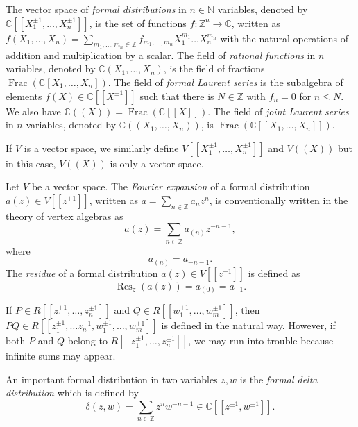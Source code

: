\documentclass[a4paper, 12pt, reqno]{amsart}
\theoremstyle{remark}
\numberwithin{equation}{subsection}
\DeclareMathOperator{\Frac}{Frac}
\DeclareMathOperator{\Res}{Res}
\begin{document}
The vector space of \emph{formal distributions} in $n \in \mathbb{N}$ variables, denoted by $\mathbb{C}[[X_1^{\pm 1}, \dots, X_n^{\pm 1}]]$, is the set of functions $f: \mathbb{Z}^n \to \mathbb{C}$, written as $f(X_1, \dots, X_n) = \sum_{m_1, \dots, m_n \in \mathbb{Z}}f_{m_1, \dots, m_n}X_1^{m_1}\dots X_n^{m_n} $ with the natural operations of addition and multiplication by a scalar.
The field of \emph{rational functions} in $n$ variables, denoted by $\mathbb{C}(X_1, \dots, X_n)$, is the field of fractions $\Frac(\mathbb{C}[X_1, \dots, X_n])$.
The field of \emph{formal Laurent series} is the subalgebra of elements $f(X) \in \mathbb{C}[[X^{\pm 1}]]$ such that there is $N \in \mathbb{Z}$ with $f_n = 0$ for $n \le N$.
We also have $\mathbb{C}((X)) = \Frac(\mathbb{C}[[X]])$.
The field of \emph{joint Laurent series} in $n$ variables, denoted by $\mathbb{C}((X_1, \dots, X_n))$, is $\Frac(\mathbb{C}[[X_1, \dots, X_n]])$.

If $V$ is a vector space, we similarly define $V[[X_1^{\pm 1}, \dots, X_n^{\pm 1}]]$ and $V((X))$ but in this case, $V((X))$ is only a vector space.

Let $V$ be a vector space.
The \emph{Fourier expansion} of a formal distribution $a(z) \in V[[z^{\pm 1}]]$, written as $a = \sum_{n \in \mathbb{Z}} a_nz^n$, is conventionally written in the theory of vertex algebras as
\begin{equation*}
  a(z) = \sum_{n \in \mathbb{Z}}a_{(n)}z^{-n - 1},
\end{equation*}
where
\begin{equation*}
  a_{(n)} = a_{-n-1}.
\end{equation*}
The \emph{residue} of a formal distribution $a(z) \in V[[z^{\pm 1}]]$ is defined as
\begin{equation*}
  \Res_z(a(z)) = a_{(0)} = a_{-1}.
\end{equation*}

If $P \in R[[z_1^{\pm 1}, \dots, z_n^{\pm 1}]]$ and $Q \in R[[w_1^{\pm 1}, \dots, w_m^{\pm 1}]]$, then $PQ \in R[[z_1^{\pm 1}, \dots z_n^{\pm 1}, w_1^{\pm 1}, \dots, w_m^{\pm 1}]]$ is defined in the natural way.
However, if both $P$ and $Q$ belong to $R[[z_1^{\pm 1}, \dots, z_n^{\pm 1}]]$, we may run into trouble because infinite sums may appear.

An important formal distribution in two variables $z, w$ is the \emph{formal delta distribution} which is defined by
\begin{equation*}
  \delta(z, w) = \sum_{n \in \mathbb{Z}}z^nw^{-n - 1} \in \mathbb{C}[[z^{\pm 1}, w^{\pm 1}]].
\end{equation*}
\end{document}
